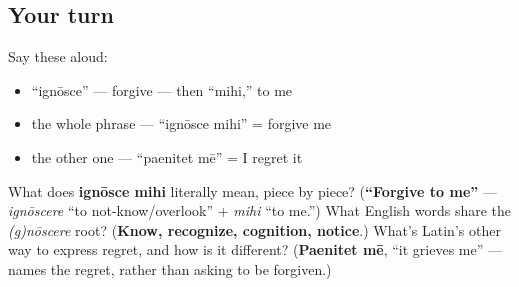 \subsection*{Your turn}
Say these aloud:

\begin{itemize}
\raggedright
  \item \textquotedblleft{}ignōsce\textquotedblright{} — forgive — then \textquotedblleft{}mihi,\textquotedblright{} to me
  \item the whole phrase — \textquotedblleft{}ignōsce mihi\textquotedblright{} = forgive me
  \item the other one — \textquotedblleft{}paenitet mē\textquotedblright{} = I regret it
\end{itemize}

\begin{tcolorbox}[breakable,colback=teal!4,colframe=teal!35!black,title={Before you move on}]
What does \textbf{ignōsce mihi} literally mean, piece by piece? (\textbf{\textquotedblleft{}Forgive to me\textquotedblright{}} — \emph{ignōscere} \textquotedblleft{}to not-know/overlook\textquotedblright{} + \emph{mihi} \textquotedblleft{}to me.\textquotedblright{}) What English words share the \emph{(g)nōscere} root? (\textbf{Know, recognize, cognition, notice}.) What's Latin's other way to express regret, and how is it different? (\textbf{Paenitet mē}, \textquotedblleft{}it grieves me\textquotedblright{} — names the regret, rather than asking to be forgiven.)
\end{tcolorbox}

